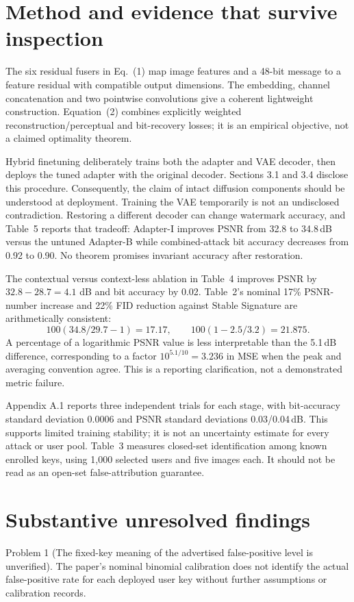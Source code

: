 \documentclass[10pt]{article}
\begin{document}
\section*{Method and evidence that survive inspection}
The six residual fusers in Eq. (1) map image features and a 48-bit message to a feature residual with compatible output dimensions. The embedding, channel concatenation and two pointwise convolutions give a coherent lightweight construction. Equation (2) combines explicitly weighted reconstruction/perceptual and bit-recovery losses; it is an empirical objective, not a claimed optimality theorem.\par
Hybrid finetuning deliberately trains both the adapter and VAE decoder, then deploys the tuned adapter with the original decoder. Sections 3.1 and 3.4 disclose this procedure. Consequently, the claim of intact diffusion components should be understood at deployment. Training the VAE temporarily is not an undisclosed contradiction. Restoring a different decoder can change watermark accuracy, and Table 5 reports that tradeoff: Adapter-I improves PSNR from 32.8 to 34.8 dB versus the untuned Adapter-B while combined-attack bit accuracy decreases from 0.92 to 0.90. No theorem promises invariant accuracy after restoration.\par
The contextual versus context-less ablation in Table 4 improves PSNR by \(32.8-28.7=4.1\) dB and bit accuracy by 0.02. Table 2’s nominal 17\% PSNR-number increase and 22\% FID reduction against Stable Signature are arithmetically consistent: \[100(34.8/29.7-1)=17.17,\qquad 100(1-2.5/3.2)=21.875.\] A percentage of a logarithmic PSNR value is less interpretable than the 5.1 dB difference, corresponding to a factor \(10^{5.1/10}=3.236\) in MSE when the peak and averaging convention agree. This is a reporting clarification, not a demonstrated metric failure.\par
Appendix A.1 reports three independent trials for each stage, with bit-accuracy standard deviation 0.0006 and PSNR standard deviations 0.03/0.04 dB. This supports limited training stability; it is not an uncertainty estimate for every attack or user pool. Table 3 measures closed-set identification among known enrolled keys, using 1,000 selected users and five images each. It should not be read as an open-set false-attribution guarantee.\par
\section*{Substantive unresolved findings}
Problem 1 (The fixed-key meaning of the advertised false-positive level is unverified).  The paper’s nominal binomial calibration does not identify the actual false-positive rate for each deployed user key without further assumptions or calibration records.\par
\end{document}
